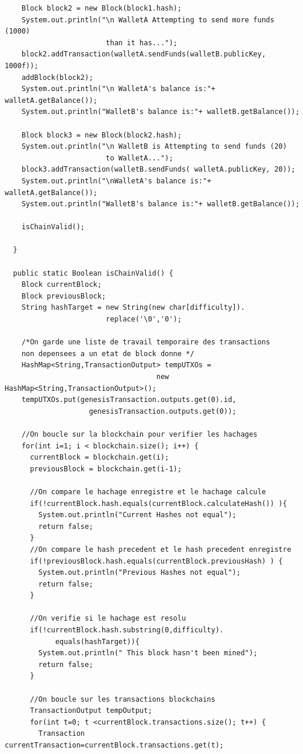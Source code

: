 \documentclass[12pt]{report}
\begin{document}
\begin{lstlisting}
    Block block2 = new Block(block1.hash);
    System.out.println("\n WalletA Attempting to send more funds (1000)
                        than it has...");
    block2.addTransaction(walletA.sendFunds(walletB.publicKey, 1000f));
    addBlock(block2);
    System.out.println("\n WalletA's balance is:"+ walletA.getBalance());
    System.out.println("WalletB's balance is:"+ walletB.getBalance());
		
    Block block3 = new Block(block2.hash);
    System.out.println("\n WalletB is Attempting to send funds (20)
                        to WalletA...");
    block3.addTransaction(walletB.sendFunds( walletA.publicKey, 20));
    System.out.println("\nWalletA's balance is:"+ walletA.getBalance());
    System.out.println("WalletB's balance is:"+ walletB.getBalance());
		
    isChainValid();
		
  }
	
  public static Boolean isChainValid() {
    Block currentBlock; 
    Block previousBlock;
    String hashTarget = new String(new char[difficulty]).
                        replace('\0','0');
    
    /*On garde une liste de travail temporaire des transactions 
    non depensees a un etat de block donne */
    HashMap<String,TransactionOutput> tempUTXOs = 
                                    new HashMap<String,TransactionOutput>();
    tempUTXOs.put(genesisTransaction.outputs.get(0).id, 
                    genesisTransaction.outputs.get(0));
		
    //On boucle sur la blockchain pour verifier les hachages
    for(int i=1; i < blockchain.size(); i++) {
      currentBlock = blockchain.get(i);
      previousBlock = blockchain.get(i-1);
      
      //On compare le hachage enregistre et le hachage calcule
      if(!currentBlock.hash.equals(currentBlock.calculateHash()) ){
        System.out.println("Current Hashes not equal");
        return false;
      }
      //On compare le hash precedent et le hash precedent enregistre
      if(!previousBlock.hash.equals(currentBlock.previousHash) ) {
        System.out.println("Previous Hashes not equal");
        return false;
      }
        
      //On verifie si le hachage est resolu
      if(!currentBlock.hash.substring(0,difficulty).
            equals(hashTarget)){
        System.out.println(" This block hasn't been mined");
        return false;
      }
			
      //On boucle sur les transactions blockchains
      TransactionOutput tempOutput;
      for(int t=0; t <currentBlock.transactions.size(); t++) {
        Transaction currentTransaction=currentBlock.transactions.get(t);
				

\end{lstlisting}
\end{document}
